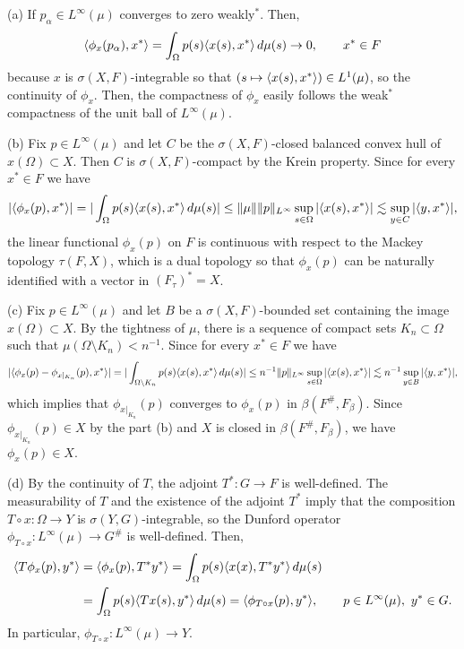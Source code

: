 \documentclass{../../small}
\begin{document}
\begin{pf}
(a)
If $p_\alpha\in L^\infty(\mu)$ converges to zero weakly$^*$.
Then,
\[\langle\phi_x(p_\alpha),x^*\rangle=\int_\Omega p(s)\langle x(s),x^*\rangle\,d\mu(s)\to0,\qquad x^*\in F\]
because $x$ is $\sigma(X,F)$-integrable so that $(s\mapsto\langle x(s),x^*\rangle)\in L^1(\mu)$, so the continuity of $\phi_x$.
Then, the compactness of $\phi_x$ easily follows the weak$^*$ compactness of the unit ball of $L^\infty(\mu)$.

(b)
Fix $p\in L^\infty(\mu)$ and let $C$ be the $\sigma(X,F)$-closed balanced convex hull of $x(\Omega)\subset X$.
Then $C$ is $\sigma(X,F)$-compact by the Krein property.
Since for every $x^*\in F$ we have
\[|\langle\phi_x(p),x^*\rangle|=|\int_\Omega p(s)\langle x(s),x^*\rangle\,d\mu(s)|
\le\|\mu\|\|p\|_{L^\infty}\sup_{s\in\Omega}|\langle x(s),x^*\rangle|\lesssim\sup_{y\in C}|\langle y,x^*\rangle|,\]
the linear functional $\phi_x(p)$ on $F$ is continuous with respect to the Mackey topology $\tau(F,X)$, which is a dual topology so that $\phi_x(p)$ can be naturally identified with a vector in $(F_\tau)^*=X$.

(c)
Fix $p\in L^\infty(\mu)$ and let $B$ be a $\sigma(X,F)$-bounded set containing the image $x(\Omega)\subset X$.
By the tightness of $\mu$, there is a sequence of compact sets $K_n\subset\Omega$ such that $\mu(\Omega\setminus K_n)<n^{-1}$.
Since for every $x^*\in F$ we have
\[|\langle\phi_x(p)-\phi_{x|_{K_n}}(p),x^*\rangle|=|\int_{\Omega\setminus K_n}p(s)\langle x(s),x^*\rangle\,d\mu(s)|\le n^{-1}\|p\|_{L^\infty}\sup_{s\in\Omega}|\langle x(s),x^*\rangle|\lesssim n^{-1}\sup_{y\in B}|\langle y,x^*\rangle|,\]
which implies that $\phi_{x|_{K_n}}(p)$ converges to $\phi_x(p)$ in $\beta(F^\#,F_\beta)$.
Since $\phi_{x|_{K_n}}(p)\in X$ by the part (b) and $X$ is closed in $\beta(F^\#,F_\beta)$, we have $\phi_x(p)\in X$.

(d)
By the continuity of $T$, the adjoint $T^*:G\to F$ is well-defined.
The measurability of $T$ and the existence of the adjoint $T^*$ imply that the composition $T\circ x:\Omega\to Y$ is $\sigma(Y,G)$-integrable, so the Dunford operator $\phi_{T\circ x}:L^\infty(\mu)\to G^\#$ is well-defined.
Then,
\begin{align*}
\langle T\phi_x(p),y^*\rangle&=\langle\phi_x(p),T^*y^*\rangle=\int_\Omega p(s)\langle x(x),T^*y^*\rangle\,d\mu(s)\\
&=\int_\Omega p(s)\langle Tx(s),y^*\rangle\,d\mu(s)=\langle\phi_{T\circ x}(p),y^*\rangle,\qquad p\in L^\infty(\mu),\ y^*\in G.
\end{align*}
In particular, $\phi_{T\circ x}:L^\infty(\mu)\to Y$.
\end{pf}
\end{document}
